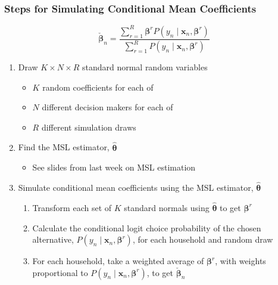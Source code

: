 \documentclass{beamer}\usepackage[]{graphicx}\usepackage[]{color}
\begin{document}
\begin{frame}\frametitle{Steps for Simulating Conditional Mean Coefficients}
    $$\check{\bm{\beta}}_n = \frac{\sum_{r = 1}^R \bm{\beta}^r P(y_n \mid \bm{x}_n, \bm{\beta}^r)}{\sum_{r = 1}^R P(y_n \mid \bm{x}_n, \bm{\beta}^r)}$$
    \begin{enumerate}
        \item Draw $K \times N \times R$ standard normal random variables
        \begin{itemize}
            \item $K$ random coefficients for each of
            \item $N$ different decision makers for each of
            \item $R$ different simulation draws
        \end{itemize}
        \item Find the MSL estimator, $\widehat{\bm{\theta}}$
        \begin{itemize}
            \item See slides from last week on MSL estimation
        \end{itemize}
        \item Simulate conditional mean coefficients using the MSL estimator, $\widehat{\bm{\theta}}$
        \begin{enumerate}
            \item Transform each set of $K$ standard normals using $\widehat{\bm{\theta}}$ to get $\bm{\beta}^r$
            \item Calculate the conditional logit choice probability of the chosen alternative, $P(y_n \mid \bm{x}_n, \bm{\beta}^r)$, for each household and random draw
            \item For each household, take a weighted average of $\bm{\beta}^r$, with weights proportional to $P(y_n \mid \bm{x}_n, \bm{\beta}^r)$, to get $\check{\bm{\beta}}_n$
        \end{enumerate}
    \end{enumerate}
\end{frame}
\end{document}
